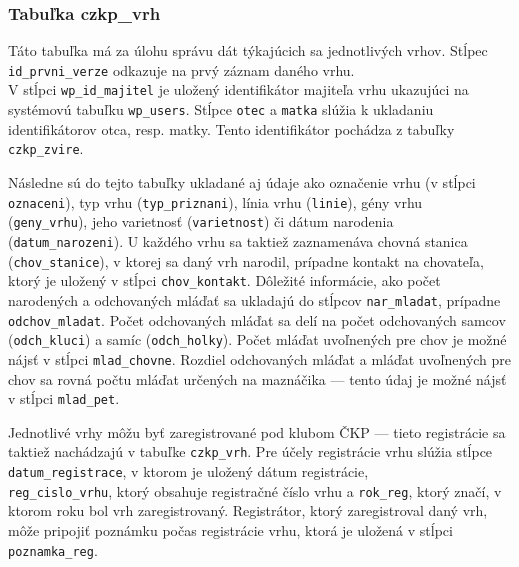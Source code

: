 \subsubsection*{Tabuľka czkp\_vrh}

Táto tabuľka má za úlohu správu dát týkajúcich sa jednotlivých vrhov. Stĺpec \texttt{id_prvni_verze} odkazuje na prvý záznam daného vrhu. \\ V stĺpci \texttt{wp_id_majitel} je uložený identifikátor majiteľa vrhu ukazujúci na systémovú tabuľku \texttt{wp_users}. Stĺpce \texttt{otec} a \texttt{matka} slúžia k ukladaniu identifikátorov otca, resp. matky. Tento identifikátor pochádza z tabuľky \texttt{czkp_zvire}.

Následne sú do tejto tabuľky ukladané aj údaje ako označenie vrhu (v stĺpci \texttt{oznaceni}), typ vrhu (\texttt{typ_priznani}), línia vrhu (\texttt{linie}), gény vrhu \\ (\texttt{geny_vrhu}), jeho varietnosť (\texttt{varietnost}) či dátum narodenia \\ (\texttt{datum_narozeni}). U každého vrhu sa taktiež zaznamenáva chovná stanica (\texttt{chov_stanice}), v ktorej sa daný vrh narodil, prípadne kontakt na chovateľa, ktorý je uložený v stĺpci \texttt{chov_kontakt}. Dôležité informácie, ako počet narodených a odchovaných mláďať sa ukladajú do stĺpcov \texttt{nar_mladat}, prípadne \texttt{odchov_mladat}. Počet odchovaných mláďat sa delí na počet odchovaných samcov (\texttt{odch_kluci}) a samíc (\texttt{odch_holky}). Počet mláďat uvoľnených pre chov je možné nájsť v stĺpci \texttt{mlad_chovne}. Rozdiel odchovaných mláďat a mláďat uvoľnených pre chov sa rovná počtu mláďat určených na maznáčika --- tento údaj je možné nájsť v stĺpci \texttt{mlad_pet}.

Jednotlivé vrhy môžu byť zaregistrované pod klubom ČKP --- tieto registrácie sa taktiež nachádzajú v tabuľke \texttt{czkp_vrh}. Pre účely registrácie vrhu slúžia stĺpce \texttt{datum_registrace}, v ktorom je uložený dátum registrácie, \\ \texttt{reg_cislo_vrhu}, ktorý obsahuje registračné číslo vrhu a \texttt{rok_reg}, ktorý značí, v ktorom roku bol vrh zaregistrovaný. Registrátor, ktorý zaregistroval daný vrh, môže pripojiť poznámku počas registrácie vrhu, ktorá je uložená v stĺpci \texttt{poznamka_reg}.

